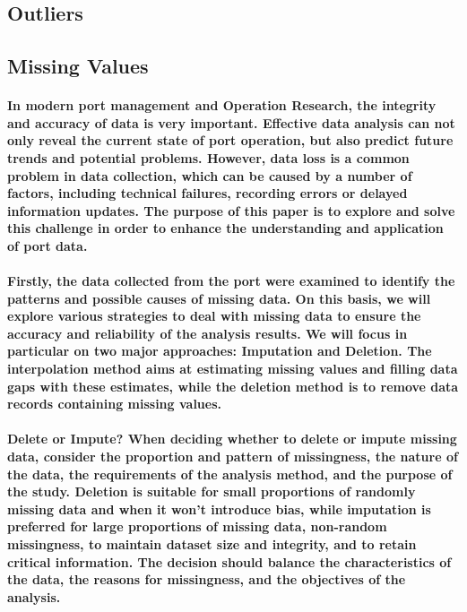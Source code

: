 \documentclass[11pt]{article} %
\begin{document}
\subsection{Outliers}
% 
% 
% 
% 
% 
% 
% 
% 
% 
% 
% 
\subsection{Missing Values}
% 
% 
% 
% 
% 
% 
\paragraph{In modern port management and Operation Research, the integrity and accuracy of data is very important. Effective data analysis can not only reveal the current state of port operation, but also predict future trends and potential problems. However, data loss is a common problem in data collection, which can be caused by a number of factors, including technical failures, recording errors or delayed information updates. The purpose of this paper is to explore and solve this challenge in order to enhance the understanding and application of port data.}
% 
% 
% 
% 
% 
% 
\paragraph{Firstly, the data collected from the port were examined to identify the patterns and possible causes of missing data. On this basis, we will explore various strategies to deal with missing data to ensure the accuracy and reliability of the analysis results. We will focus in particular on two major approaches: Imputation and Deletion. The interpolation method aims at estimating missing values and filling data gaps with these estimates, while the deletion method is to remove data records containing missing values.}
% 
% 
% 
\paragraph{\textbf{Delete or Impute?} When deciding whether to delete or impute missing data, consider the proportion and pattern of missingness, the nature of the data, the requirements of the analysis method, and the purpose of the study. Deletion is suitable for small proportions of randomly missing data and when it won't introduce bias, while imputation is preferred for large proportions of missing data, non-random missingness, to maintain dataset size and integrity, and to retain critical information. The decision should balance the characteristics of the data, the reasons for missingness, and the objectives of the analysis. \cite{Jakobsen2017}}
% 
% 
% 
% 
\end{document}
